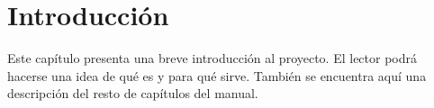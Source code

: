 %
%
%
%
%
%
%
%
%
%

\chapter{Introducci\'on}

\begin{FraseCelebre}
\begin{Frase}
\end{Frase}
\begin{Fuente}
\end{Fuente}
\end{FraseCelebre}

\begin{resumen}
  Este cap\'itulo presenta una breve introducci\'on al proyecto.  El
  lector podr\'a hacerse una idea de qu\'e es y para qu\'e sirve. Tambi\'en se
  encuentra aqu\'i una descripci\'on del resto de cap\'itulos del manual.
\end{resumen}



